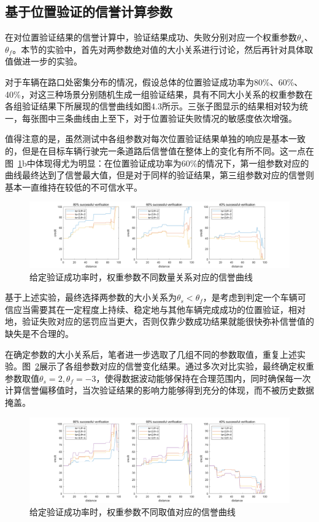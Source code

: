 \subsection{基于位置验证的信誉计算参数}
在对位置验证结果的信誉计算中，验证结果成功、失败分别对应一个权重参数$\theta_s$、$\theta_f$。本节的实验中，首先对两参数绝对值的大小关系进行讨论，然后再针对具体取值做进一步的实验。

对于车辆在路口处密集分布的情况，假设总体的位置验证成功率为80\%、60\%、40\%，对这三种场景分别随机生成一组验证结果，具有不同大小关系的权重参数在各组验证结果下所展现的信誉曲线如图4.3所示。三张子图显示的结果相对较为统一，每张图中三条曲线由上至下，对于位置验证失败情况的敏感度依次增强。

值得注意的是，虽然测试中各组参数对每次位置验证结果单独的响应是基本一致的，但是在目标车辆行驶完一条道路后信誉值在整体上的变化有所不同。这一点在图~\ref{fig:theta_comp}b中体现得尤为明显：在位置验证成功率为60\%的情况下，第一组参数对应的曲线最终达到了信誉最大值，但是对于同样的验证结果，第三组参数对应的信誉则基本一直维持在较低的不可信水平。

\begin{figure}
  \centering
  \includegraphics[width=1\linewidth]{figures/theta_comp_total.png}
  \caption{给定验证成功率时，权重参数不同数量关系对应的信誉曲线}
  \label{fig:theta_comp}
\end{figure}

基于上述实验，最终选择两参数的大小关系为$\theta_s<\theta_f$，是考虑到判定一个车辆可信应当需要其在一定程度上持续、稳定地与其他车辆完成成功的位置验证，相对地，验证失败对应的惩罚应当更大，否则仅靠少数成功结果就能很快弥补信誉值的缺失是不合理的。

在确定参数的大小关系后，笔者进一步选取了几组不同的参数取值，重复上述实验。图~\ref{fig:theta_num}展示了各组参数对应的信誉变化结果。通过多次对比实验，最终确定权重参数取值$\theta_{s}=2,\theta_{f}=-3$，使得数据波动能够保持在合理范围内，同时确保每一次计算信誉偏移值时，当次验证结果的影响力能够得到充分的体现，而不被历史数据掩盖。

\begin{figure}
  \centering
  \includegraphics[width=1\linewidth]{figures/theta_num_total.png}
  \caption{给定验证成功率时，权重参数不同取值对应的信誉曲线}
  \label{fig:theta_num}
\end{figure}

